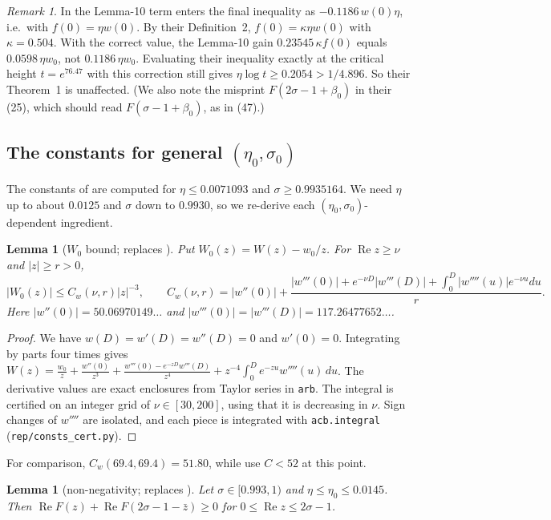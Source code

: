 \documentclass[11pt]{amsart}
\numberwithin{equation}{section}
\newtheorem{lemma}[theorem]{Lemma}
\theoremstyle{definition}
\theoremstyle{remark}
\newtheorem{remark}[theorem]{Remark}
\newcommand{\Rp}{\operatorname{Re}}
\newcommand{\code}[1]{\texttt{#1}}
\begin{document}
\begin{remark}\label{rem:btyf0}
In \cite{BTY} the Lemma-10 term enters the final inequality as $-0.1186\,w(0)\eta$, i.e.\ with $f(0) = \eta w(0)$.
By their Definition~2, $f(0) = \kappa\eta w(0)$ with $\kappa = 0.504$.
With the correct value, the Lemma-10 gain $0.23545\,\kappa f(0)$ equals $0.0598\,\eta w_0$, not $0.1186\,\eta w_0$.
Evaluating their inequality exactly at the critical height $t = e^{76.47}$ with this correction still gives $\eta\log t \ge 0.2054 > 1/4.896$.
So their Theorem~1 is unaffected.
(We also note the misprint $F(2\sigma-1+\beta_0)$ in their (25), which should read $F(\sigma - 1 + \beta_0)$, as in (47).)
\end{remark}

\subsection{The constants for general $(\eta_0,\sigma_0)$}\label{ss:constants}
The constants of \cite{BTY} are computed for $\eta \le 0.0071093$ and $\sigma \ge 0.9935164$.
We need $\eta$ up to about $0.0125$ and $\sigma$ down to $0.9930$, so we re-derive each $(\eta_0,\sigma_0)$-dependent ingredient.

\begin{lemma}[$W_0$ bound; replaces {\cite[Lemma~4]{BTY}}]\label{lem:W0}
Put $W_0(z) = W(z) - w_0/z$. For $\Rp z \ge \nu$ and $|z| \ge r > 0$,
\[
|W_0(z)| \le C_w(\nu,r)|z|^{-3}, \qquad C_w(\nu,r) = |w''(0)| + \frac{|w'''(0)| + e^{-\nu D}|w'''(D)| + \int_0^D|w''''(u)|e^{-\nu u}du}{r} .
\]
Here $|w''(0)| = 50.06970149\ldots$ and $|w'''(0)| = |w'''(D)| = 117.26477652\ldots$.
\end{lemma}

\begin{proof}
We have $w(D) = w'(D) = w''(D) = 0$ and $w'(0) = 0$.
Integrating by parts four times gives
$W(z) = \frac{w_0}{z} + \frac{w''(0)}{z^3} + \frac{w'''(0) - e^{-zD}w'''(D)}{z^4} + z^{-4}\int_0^De^{-zu}w''''(u)\,du$.
The derivative values are exact enclosures from Taylor series in \code{arb}.
The integral is certified on an integer grid of $\nu \in [30,200]$, using that it is decreasing in $\nu$.
Sign changes of $w''''$ are isolated, and each piece is integrated with \code{acb.integral} (\code{rep/consts\_cert.py}).
\end{proof}

For comparison, $C_w(69.4, 69.4) = 51.80$, while \cite{BTY} use $C < 52$ at this point.

\begin{lemma}[non-negativity; replaces {\cite[Lemma~5, (21)]{BTY}}]\label{lem:L5}
Let $\sigma\in[0.993,1)$ and $\eta \le \eta_0 \le 0.0145$. Then $\Rp F(z) + \Rp F(2\sigma - 1 - \bar z) \ge 0$ for $0 \le \Rp z \le 2\sigma-1$.
\end{lemma}
\end{document}
